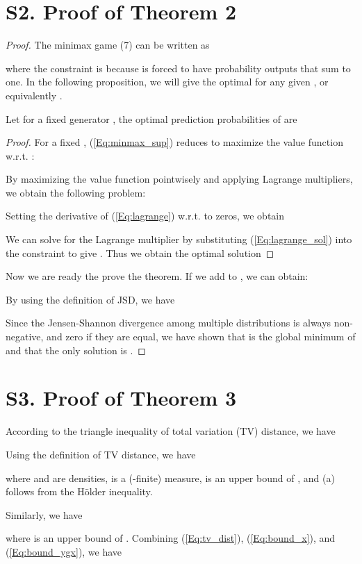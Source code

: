 \section*{S2. Proof of Theorem 2}
\begin{proof}
The minimax game (7) can be written as

where the constraint is because  is forced to have probability outputs that sum to one. In the following proposition, we will give the optimal  for any given , or equivalently . 
\begin{Proposition}
Let for a fixed generator , the optimal prediction probabilities  of  are 

\end{Proposition}
\begin{proof}
For a fixed , (\ref{Eq:minmax_sup}) reduces to maximize the value function  w.r.t. :

By maximizing the value function pointwisely and applying Lagrange multipliers, we obtain the following problem:

Setting the derivative of (\ref{Eq:lagrange}) w.r.t.  to zeros, we obtain

We can solve for the Lagrange multiplier  by substituting (\ref{Eq:lagrange_sol}) into the constraint  to give . Thus we obtain the optimal solution

\end{proof}

Now we are ready the prove the theorem.
If we add  to , we can obtain:

By using the definition of JSD, we have

Since the Jensen-Shannon divergence among multiple distributions is always non-negative, and zero if they are equal, we have shown that  is the global minimum of  and that the only solution is .
\end{proof}

\section*{S3. Proof of Theorem 3}
According to the triangle inequality of total variation (TV) distance, we have

Using the definition of TV distance, we have

where  and  are densities,  is a (-finite) measure,  is an upper bound of  , and (a) follows from the H{\"o}lder inequality.

Similarly, we have 

where  is an upper bound of  . Combining (\ref{Eq:tv_dist}), (\ref{Eq:bound_x}), and (\ref{Eq:bound_ygx}), we have 

